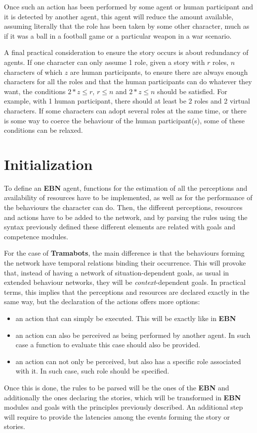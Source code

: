 \documentclass[
		twoside,openright,titlepage,numbers=noenddot,manychapters,
		headinclude,%
                footinclude=false,cleardoublepage=empty,
                BCOR=5mm,
		fontsize=11pt, %
                 enabledeprecatedfontcommands]{scrreprt}
\begin{document}
Once such an action has been performed by some agent or human participant and it is detected  by another agent, this agent  will reduce the amount available, assuming literally that the role has been taken by some other character, much as if  it was a ball in a football game or a particular weapon in a war scenario.

A final practical consideration to ensure the story occurs is about redundancy of agents. If one character can only assume 1 role, given a story with $r$ roles, $n$ characters of which $z$ are human participants, to ensure there are always enough characters for all the roles and that the human participants can do whatever they want, the conditions $ 2*z \leq r $, $r \leq n$ and $2*z \leq n$ should be satisfied. For example, with 1 human participant, there should at least be 2 roles and 2 virtual characters. If some characters can adopt several roles at the same time, or there is some way to coerce the behaviour of the human participant(s), some of these conditions can be relaxed.


\section{Initialization}


To define an \textbf{EBN} agent, functions for the estimation of all the perceptions and availability of resources have to be implemented, as well as for the performance of the behaviours the character can do. Then, the different perceptions, resources and actions have to be added to the network, and by parsing the rules using the syntax previously defined these different elements are related with goals and competence modules.

For the case of \textbf{Tramabots}, the main difference is that the behaviours forming the network  have temporal relations binding their occurrence. This will provoke that, instead of having a network of situation-dependent goals, as usual in extended behaviour networks, they will be \emph{context}-dependent goals. In practical terms, this implies that the perceptions and resources are declared exactly in the same way, but the declaration of the actions offers more options:
\begin{itemize}
\item an action that can simply be executed. This will be exactly like in \textbf{EBN}
\item an action can also be perceived as being performed by another agent. In such case a function to evaluate this case should also be provided.
\item an action can not only be perceived, but also has a specific role associated with it. In such case, such role should be specified. 
\end{itemize}
Once this is done, the rules to be parsed will be the ones of the \textbf{EBN} and additionally the ones declaring the stories, which will be transformed in \textbf{EBN} modules and goals with the principles previously described. An additional step will require to  provide the latencies among the events forming the story or stories.
\end{document}
